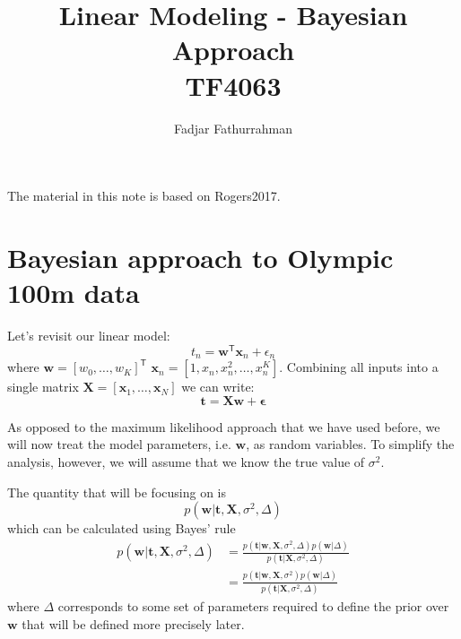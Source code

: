 




\title{Linear Modeling - Bayesian Approach\\
TF4063}
\author{Fadjar Fathurrahman}
\date{}
\maketitle

The material in this note is based on Rogers2017.



\section{Bayesian approach to Olympic 100m data}

Let's revisit our linear model:
\begin{equation}
t_{n} = \mathbf{w}^{\mathsf{T}}\mathbf{x}_{n} + \epsilon_{n}
\end{equation}
where $\mathbf{w} = \left[ w_{0}, \ldots, w_{K} \right]^{\mathsf{T}}$
$\mathbf{x}_{n} = \left[ 1, x_{n}, x^{2}_{n}, \ldots, x_{n}^{K} \right]$.
Combining all inputs into a single matrix
$\mathbf{X} = \left[ \mathbf{x}_{1}, \ldots, \mathbf{x}_{N} \right]$
we can write:
\begin{equation}
\mathbf{t} = \mathbf{Xw} + \boldsymbol{\epsilon}
\end{equation}

As opposed to the maximum likelihood approach that we have used before,
we will now treat the model parameters, i.e. $\mathbf{w}$, as random variables.
To simplify the analysis, however, we will assume that we know the true value
of $\sigma^2$.

The quantity that will be focusing on is
\begin{equation}
p(\mathbf{w} | \mathbf{t}, \mathbf{X}, \sigma^2, \Delta)
\end{equation}
which can be calculated using Bayes' rule
\begin{align}
p(\mathbf{w} | \mathbf{t}, \mathbf{X}, \sigma^2, \Delta) & = 
\frac{p(\mathbf{t}|\mathbf{w},\mathbf{X},\sigma^2,\Delta) p(\mathbf{w} | \Delta)}%
{p(\mathbf{t} | \mathbf{X},\sigma^2,\Delta)} \\
& = \frac{p(\mathbf{t}|\mathbf{w},\mathbf{X},\sigma^2) p(\mathbf{w} | \Delta)}%
{p(\mathbf{t} | \mathbf{X},\sigma^2,\Delta)}
\end{align}
where $\Delta$ corresponds to some set of parameters required to define the prior
over $\mathbf{w}$ that will be defined more precisely later.

